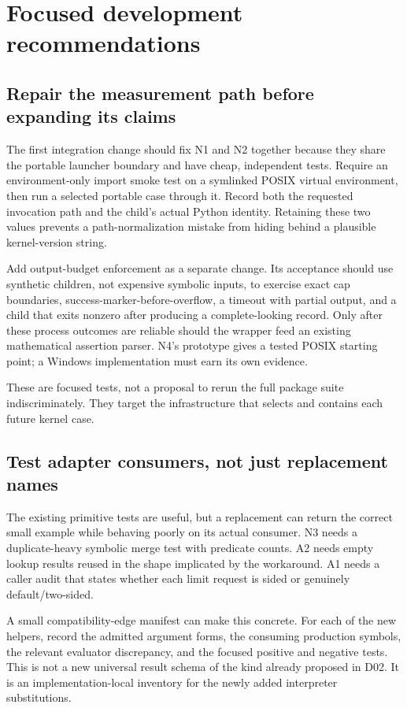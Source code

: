 \documentclass[11pt,letterpaper]{article}
\begin{document}
\section{Focused development recommendations}
\label{sec:recommendations}

\subsection{Repair the measurement path before expanding its claims}

The first integration change should fix N1 and N2 together because they share the portable launcher boundary and have cheap, independent tests. Require an environment-only import smoke test on a symlinked POSIX virtual environment, then run a selected portable case through it. Record both the requested invocation path and the child's actual Python identity. Retaining these two values prevents a path-normalization mistake from hiding behind a plausible kernel-version string.

Add output-budget enforcement as a separate change. Its acceptance should use synthetic children, not expensive symbolic inputs, to exercise exact cap boundaries, success-marker-before-overflow, a timeout with partial output, and a child that exits nonzero after producing a complete-looking record. Only after these process outcomes are reliable should the wrapper feed an existing mathematical assertion parser. N4's prototype gives a tested POSIX starting point; a Windows implementation must earn its own evidence.

These are focused tests, not a proposal to rerun the full package suite indiscriminately. They target the infrastructure that selects and contains each future kernel case.

\subsection{Test adapter consumers, not just replacement names}

The existing primitive tests are useful, but a replacement can return the correct small example while behaving poorly on its actual consumer. N3 needs a duplicate-heavy symbolic merge test with predicate counts. A2 needs empty lookup results reused in the shape implicated by the workaround. A1 needs a caller audit that states whether each limit request is sided or genuinely default/two-sided.

A small compatibility-edge manifest can make this concrete. For each of the new helpers, record the admitted argument forms, the consuming production symbols, the relevant evaluator discrepancy, and the focused positive and negative tests. This is not a new universal result schema of the kind already proposed in D02. It is an implementation-local inventory for the newly added interpreter substitutions.
\end{document}
